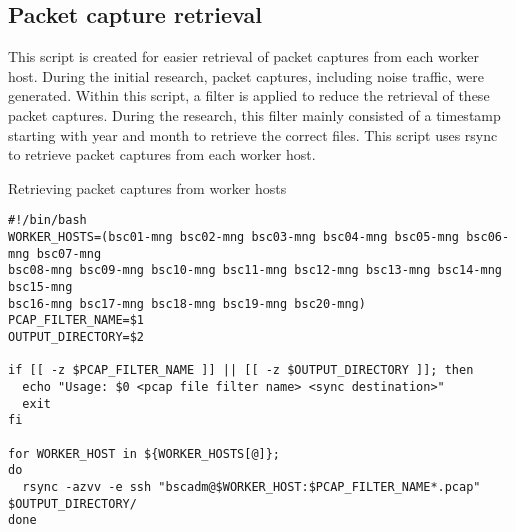 \subsection{Packet capture retrieval}
\label{ss:PcapRetrieval}

This script is created for easier retrieval of packet captures from each worker host.
During the initial research, packet captures, including noise traffic, were generated.
Within this script, a filter is applied to reduce the retrieval of these packet captures.
During the research, this filter mainly consisted of a timestamp starting with year and month to retrieve the correct files.
This script uses rsync to retrieve packet captures from each worker host.
\begin{listing}[!ht]
\caption{Retrieving packet captures from worker hosts}
\label{lst:PcapRetrival}
\begin{verbatim}
#!/bin/bash
WORKER_HOSTS=(bsc01-mng bsc02-mng bsc03-mng bsc04-mng bsc05-mng bsc06-mng bsc07-mng 
bsc08-mng bsc09-mng bsc10-mng bsc11-mng bsc12-mng bsc13-mng bsc14-mng bsc15-mng 
bsc16-mng bsc17-mng bsc18-mng bsc19-mng bsc20-mng)
PCAP_FILTER_NAME=$1
OUTPUT_DIRECTORY=$2

if [[ -z $PCAP_FILTER_NAME ]] || [[ -z $OUTPUT_DIRECTORY ]]; then
  echo "Usage: $0 <pcap file filter name> <sync destination>"
  exit
fi

for WORKER_HOST in ${WORKER_HOSTS[@]};
do
  rsync -azvv -e ssh "bscadm@$WORKER_HOST:$PCAP_FILTER_NAME*.pcap" $OUTPUT_DIRECTORY/
done
\end{verbatim}
\end{listing}
